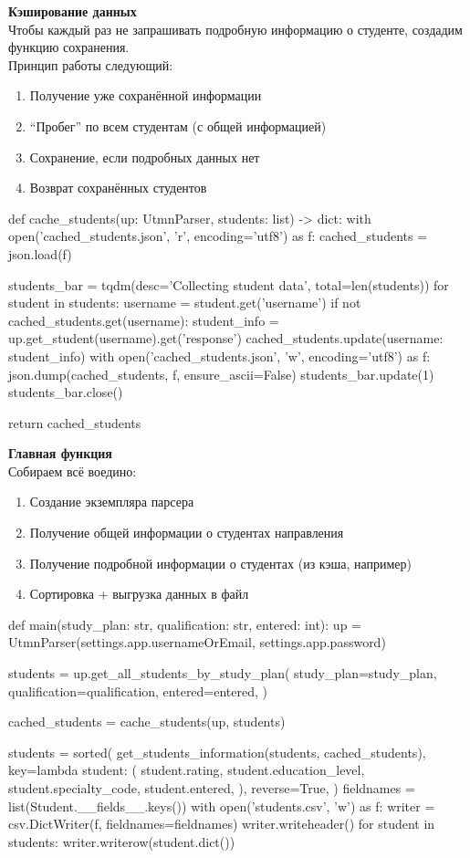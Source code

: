 \documentclass[a4paper,12pt]{article} %
\begin{document}
\textbf{Кэширование данных} \\
Чтобы каждый раз не запрашивать подробную информацию о студенте, создадим функцию сохранения. \\
Принцип работы следующий: 
\begin{enumerate}
    \item Получение уже сохранённой информации
    \item \enquote{Пробег} по всем студентам (с общей информацией)
    \item Сохранение, если подробных данных нет 
    \item Возврат сохранённых студентов
\end{enumerate}
\begin{python}
def cache_students(up: UtmnParser, students: list) -> dict:
    with open('cached_students.json', 'r', encoding='utf8') as f:
        cached_students = json.load(f)

    students_bar = tqdm(desc='Collecting student data', total=len(students))
    for student in students:
        username = student.get('username')
        if not cached_students.get(username):
            student_info = up.get_student(username).get('response')
            cached_students.update({username: student_info})
            with open('cached_students.json', 'w', encoding='utf8') as f:
                json.dump(cached_students, f, ensure_ascii=False)
        students_bar.update(1)
    students_bar.close()

    return cached_students
\end{python}


\textbf{Главная функция} \\
Собираем всё воедино:
\begin{enumerate}
    \item Создание экземпляра парсера
    \item Получение общей информации о студентах направления
    \item Получение подробной информации о студентах (из кэша, например)
    \item Сортировка + выгрузка данных в файл 
\end{enumerate}
\begin{python}
def main(study_plan: str, qualification: str, entered: int):
    up = UtmnParser(settings.app.usernameOrEmail, settings.app.password)

    students = up.get_all_students_by_study_plan(
        study_plan=study_plan,
        qualification=qualification,
        entered=entered,
    )

    cached_students = cache_students(up, students)

    students = sorted(
        get_students_information(students, cached_students),
        key=lambda student: (
            student.rating,
            student.education_level,
            student.specialty_code,
            student.entered,
        ),
        reverse=True,
    )
    fieldnames = list(Student.__fields__.keys())
    with open('students.csv', 'w') as f:
        writer = csv.DictWriter(f, fieldnames=fieldnames)
        writer.writeheader()
        for student in students:
            writer.writerow(student.dict())
\end{python}
\end{document}
